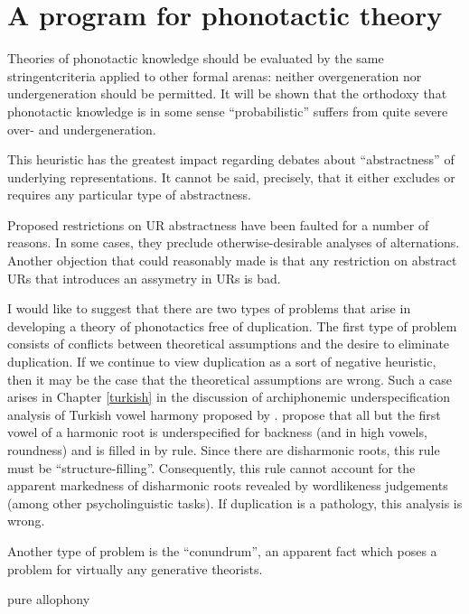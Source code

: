 \label{intro}


\section{A program for phonotactic theory}



Theories of phonotactic knowledge should be evaluated by the same stringentcriteria applied to other formal arenas: neither overgeneration nor undergeneration should be permitted. It will be shown that the orthodoxy that phonotactic knowledge is in some sense ``probabilistic'' suffers from quite severe over- and undergeneration. 

This heuristic has the greatest impact regarding debates about ``abstractness'' of underlying representations. 
It cannot be said, precisely, that it either excludes or requires any particular type of abstractness. 

Proposed restrictions on UR abstractness have been faulted for a number of reasons. In some cases, they preclude otherwise-desirable analyses of alternations. Another objection that could reasonably made is that any restriction on abstract URs that introduces an assymetry in URs is bad.
\citep[~chap.~1]{KK77}

I would like to suggest that there are two types of problems that arise in developing a theory of phonotactics free of duplication. The first type of problem consists of conflicts between theoretical assumptions and the desire to eliminate duplication. If we continue to view duplication as a sort of negative heuristic, then it may be the case that the theoretical assumptions are wrong. Such a case arises in Chapter \ref{turkish} in the discussion of archiphonemic underspecification analysis of Turkish vowel harmony proposed by \citet{Clements1982}. \citeauthor{Clemenst1982} propose that all but the first vowel of a harmonic root is underspecified for backness (and in high vowels, roundness) and is filled in by rule. Since there are disharmonic roots, this rule must be ``structure-filling''. Consequently, this rule cannot account for the apparent markedness of disharmonic roots revealed by wordlikeness judgements (among other psycholinguistic tasks). If duplication is a pathology, this analysis is wrong.

Another type of problem is the ``conundrum'', an apparent fact which poses a problem for virtually any generative theorists. 

pure allophony

